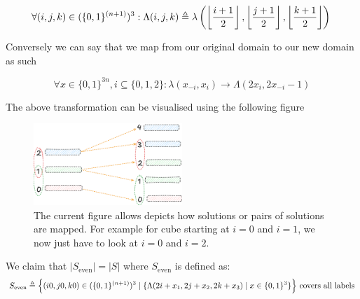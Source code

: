 $$
    \forall (i,j,k) \in (\{0,1\}^{(n+1)})^3: \Lambda(i,j,k) \triangleq 
\lambda\left( \left\lfloor  \frac{{i+1}}{2}  \right\rfloor, \left\lfloor  \frac{{j+1}}{2} \right\rfloor, \left\lfloor  \frac{{k+1}}{2} \right\rfloor \right)  \\
$$

Conversely we can say that we map from our original domain to our new domain as such

$$
\forall  x \in \{ 0,1 \}^{3n}, i \subseteq \{ 0,1,2 \}: \lambda(x_{-i}, x_{i}) \to \Lambda(2x_{i}, 2x_{-i} -1)
$$

The above transformation can be visualised using the following figure

\begin{figure}[h!]
    \centering
    \includegraphics[width=0.5\textwidth]{assets/1751381227.png}
    \caption{The current figure allows depicts how solutions or pairs of solutions are mapped. For example for cube starting at 
        $i = 0$ and $i = 1$, we now just have to look at $i = 0$ and $i = 2$.}
    \label{fig:main-proof:set_mapping}
\end{figure}


\begin{claim}
    \label{clm:main-proof:trans-claim}
    We claim that $|S_{\text{even}}| = |S|$ where $S_{\text{even}}$  is defined as:
    $$
S_{\text{even}} \triangleq
   \Big\{(i0,j0,k0) \in (\{0,1\}^{(n+1)})^3 \mid  \\
   \{\Lambda(2i + x_1, 2j + x_2, 2k + x_3) \mid x \in \{0,1\}^3 \}\Big\} \text{ covers all labels}
    $$
\end{claim}

